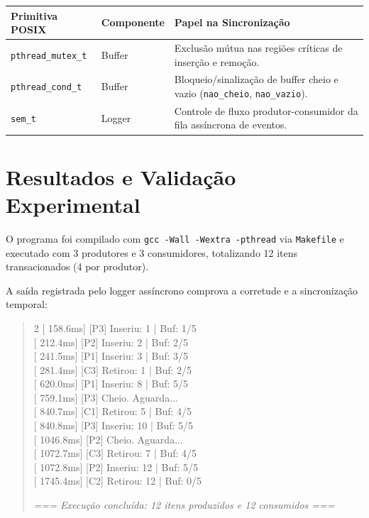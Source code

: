 \documentclass[11pt, a4paper]{article}
\begin{document}
\vspace{-0.1cm}
\begin{center}
\small
\begin{tabularx}{\linewidth}{|l|l|X|}
\hline
\textbf{Primitiva POSIX} & \textbf{Componente} & \textbf{Papel na Sincronização} \\
\hline
\texttt{pthread\_mutex\_t} & Buffer & Exclusão mútua nas regiões críticas de inserção e remoção. \\
\hline
\texttt{pthread\_cond\_t}  & Buffer & Bloqueio/sinalização de buffer cheio e vazio (\texttt{nao\_cheio}, \texttt{nao\_vazio}). \\
\hline
\texttt{sem\_t}            & Logger & Controle de fluxo produtor-consumidor da fila assíncrona de eventos. \\
\hline
\end{tabularx}
\end{center}
\vspace{-0.2cm}

\section{Resultados e Validação Experimental}

O programa foi compilado com \texttt{gcc -Wall -Wextra -pthread} via \texttt{Makefile} e executado com 3 produtores e 3 consumidores, totalizando 12 itens transacionados (4 por produtor). 

A saída registrada pelo logger assíncrono comprova a corretude e a sincronização temporal:

\begin{quote}
\ttfamily\footnotesize\raggedright
\setlength{\columnsep}{0.8cm}
\begin{multicols}{2}
\noindent
{[}  158.6ms{]} {[}P3{]} Inseriu: 1 | Buf: 1/5\\
{[}  212.4ms{]} {[}P2{]} Inseriu: 2 | Buf: 2/5\\
{[}  241.5ms{]} {[}P1{]} Inseriu: 3 | Buf: 3/5\\
{[}  281.4ms{]} {[}C3{]} Retirou: 1 | Buf: 2/5\\
{[}  620.0ms{]} {[}P1{]} Inseriu: 8 | Buf: 5/5\\
{[}  759.1ms{]} {[}P3{]} Cheio. Aguarda...\\
\columnbreak
{[}  840.7ms{]} {[}C1{]} Retirou: 5 | Buf: 4/5\\
{[}  840.8ms{]} {[}P3{]} Inseriu: 10 | Buf: 5/5\\
{[} 1046.8ms{]} {[}P2{]} Cheio. Aguarda...\\
{[} 1072.7ms{]} {[}C3{]} Retirou: 7 | Buf: 4/5\\
{[} 1072.8ms{]} {[}P2{]} Inseriu: 12 | Buf: 5/5\\
{[} 1745.4ms{]} {[}C2{]} Retirou: 12 | Buf: 0/5
\end{multicols}
\vspace{-0.3cm}
\centering \footnotesize\normalfont\textit{=== Execução concluída: 12 itens produzidos e 12 consumidos ===}
\end{quote}
\end{document}
